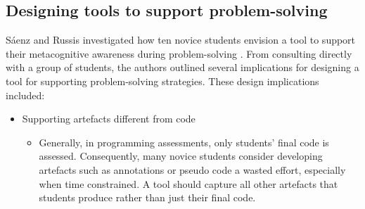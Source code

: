 \documentclass[sigconf,anonymous]{acmart}
\begin{document}
\subsection{Designing tools to support problem-solving} \label{sec:relatedwork-designing}
Sáenz and Russis investigated how ten novice students envision a tool to support their metacognitive awareness during problem-solving \cite{saenz2022}. From consulting directly with a group of students, the authors outlined several implications for designing a tool for supporting problem-solving strategies. These design implications included:
\begin{itemize}
    \item Supporting artefacts different from code

    \begin{itemize}
    \item
        Generally, in programming assessments, only students' final code is assessed. Consequently, many novice students consider developing artefacts such as annotations or pseudo code a wasted effort, especially when time constrained. A tool should capture all other artefacts that students produce rather than just their final code.
    \end{itemize}


\end{itemize}
\end{document}
